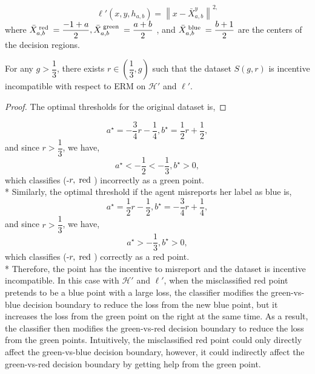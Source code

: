 \documentclass{article}
\begin{document}
\begin{equation} 
\ell'\left(x, y, h_{a, b}\right) = \left\|x - \bar{X}^{y}_{a, b}\right\|^{2,}
\end{equation}
where $\bar{X}^{\text{\;red\;}}_{a, b} = \dfrac{-1 + a}{2} , \bar{X}^{\text{\;green\;}}_{a, b} = \dfrac{a + b}{2}$ , and $\bar{X}^{\text{\;blue\;}}_{a, b} = \dfrac{b + 1}{2}$ are the centers of the decision regions.
\newline \newline
\begin{prop} \label{prop:ex2} 
For any $g  > \dfrac{1}{3}$, there exists $r  \in \left(\dfrac{1}{3}, g\right)$ such that the dataset $S\left(g, r \right) $ is incentive incompatible with respect to ERM on $\mathcal{H}'$ and $\ell'$.
\end{prop}
\begin{proof} \label{proof:ex2pf} 
The optimal thresholds for the original dataset is,
\end{proof}
\begin{equation} 
a^\star  = - \dfrac{3}{4} r - \dfrac{1}{4}, b^\star  = \dfrac{1}{2} r + \dfrac{1}{2} ,
\end{equation}
and since $r  > \dfrac{1}{3}$, we have,
\begin{equation} 
a^\star  < - \dfrac{1}{2} < - \dfrac{1}{3}, b^\star  > 0,
\end{equation}
which classifies (-$r , \text{\;red\;}$) incorrectly as a green point.
\\* Similarly, the optimal threshold if the agent misreports her label as blue is,
\begin{equation} 
a^\star  = \dfrac{1}{2} r - \dfrac{1}{2}, b^\star  = - \dfrac{3}{4} r + \dfrac{1}{4} ,
\end{equation}
and since $r  > \dfrac{1}{3}$, we have,
\begin{equation} 
a^\star  > - \dfrac{1}{3}, b^\star  > 0,
\end{equation}
which classifies (-$r , \text{\;red\;}$) correctly as a red point.
\\* Therefore, the point has the incentive to misreport and the dataset is incentive incompatible.
\newline \newline
In this case with $\mathcal{H}'$ and $\ell'$, when the misclassified red point pretends to be a blue point with a large loss, the classifier modifies the green-vs-blue decision boundary to reduce the loss from the new blue point, but it increases the loss from the green point on the right at the same time. As a result, the classifier then modifies the green-vs-red decision boundary to reduce the loss from the green points. Intuitively, the misclassified red point could only directly affect the green-vs-blue decision boundary, however, it could indirectly affect the green-vs-red decision boundary by getting help from the green point.
\newline \newline
\end{document}
